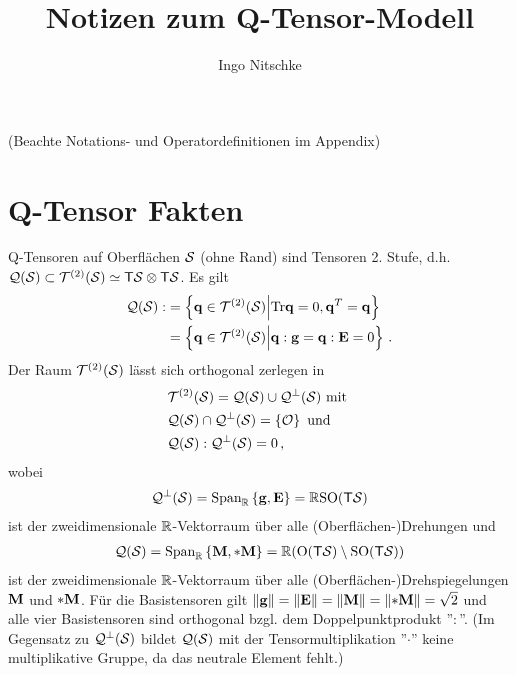 \documentclass[a4paper,11pt]{scrartcl}
\title{Notizen zum Q-Tensor-Modell}
\author{Ingo Nitschke}
\newcommand{\qspace}{\mathcal{Q}(\surf)}
\newcommand{\tspace}{\mathcal{T}^{(2)}(\surf)}
\newcommand{\Tr}{\text{Tr}}
\newcommand{\RSpan}[1]{\text{Span}_{\R}\left\{ #1 \right\}}
\begin{document}
\maketitle

(Beachte Notations- und Operatordefinitionen im Appendix)

\section{Q-Tensor Fakten}

Q-Tensoren auf Oberflächen \( \mathcal{S} \) (ohne Rand) sind Tensoren 2. Stufe, 
d.h. \( \qspace \subset \tspace \simeq \Tangent\surf\otimes\Tangent\surf \).  
Es gilt
\begin{align}
  \qspace :&= \left\{ \qb\in \tspace \middle| \Tr\qb=0, \qb^{T}=\qb \right\}\\
          &= \left\{ \qb\in \tspace \middle| \qb:\gb= \qb:\Eb = 0 \right\} \formPeriod
\end{align}
Der Raum \( \tspace \) lässt sich orthogonal zerlegen in
\begin{align}
  &\tspace = \qspace \cup \mathcal{Q}^{\bot}(\surf) \text{ mit } \\
&\qspace \cap \mathcal{Q}^{\bot}(\surf) = \left\{ \mathcal{O} \right\} \text{ und }\\
   &\qspace : \mathcal{Q}^{\bot}(\surf) = 0\formComma
\end{align}
wobei
\begin{align}
  \mathcal{Q}^{\bot}(\surf) = \RSpan{\gb,\Eb} = \R\text{SO}(\Tangent\surf)
\end{align}
ist der zweidimensionale \( \mathbb{R} \)-Vektorraum über alle (Oberflächen-)Drehungen und
\begin{align}
  \qspace = \RSpan{\Mbb, *\Mbb} = \R(\text{O}(\Tangent\surf)\setminus\text{SO}(\Tangent\surf))
\end{align}
ist der zweidimensionale \( \mathbb{R} \)-Vektorraum über alle (Oberflächen-)Drehspiegelungen \( \mathbf{M} \) und \( *\mathbf{M} \).
Für die Basistensoren gilt \( \left\| \mathbf{g} \right\| = \left\| \mathbf{E} \right\| = \left\| \mathbf{M} \right\| = \left\| *\mathbf{M} \right\| = \sqrt{2}\)
und alle vier Basistensoren sind orthogonal bzgl. dem Doppelpunktprodukt ''\( : \)''.
(Im Gegensatz zu \( \mathcal{Q}^{\bot}(\mathcal{S}) \) bildet \( \qspace \) mit der Tensormultiplikation ''\( \cdot \)'' keine multiplikative Gruppe, 
da das neutrale Element fehlt.)
\end{document}
